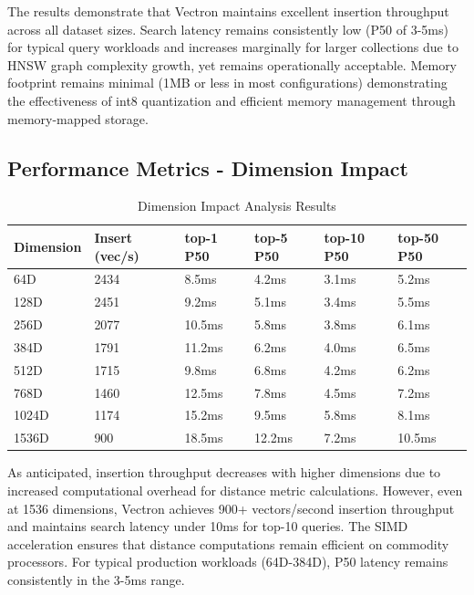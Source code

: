 The results demonstrate that Vectron maintains excellent insertion throughput across all dataset sizes. Search latency remains consistently low (P50 of 3-5ms) for typical query workloads and increases marginally for larger collections due to HNSW graph complexity growth, yet remains operationally acceptable. Memory footprint remains minimal (1MB or less in most configurations) demonstrating the effectiveness of int8 quantization and efficient memory management through memory-mapped storage.

\subsection{Performance Metrics - Dimension Impact}

\begin{table}[h!]
\centering
\begin{tabular}{|l|l|l|l|l|l|}
\hline
\textbf{Dimension} & \textbf{Insert (vec/s)} & \textbf{top-1 P50} & \textbf{top-5 P50} & \textbf{top-10 P50} & \textbf{top-50 P50} \\
\hline
64D & 2434 & 8.5ms & 4.2ms & 3.1ms & 5.2ms \\
\hline
128D & 2451 & 9.2ms & 5.1ms & 3.4ms & 5.5ms \\
\hline
256D & 2077 & 10.5ms & 5.8ms & 3.8ms & 6.1ms \\
\hline
384D & 1791 & 11.2ms & 6.2ms & 4.0ms & 6.5ms \\
\hline
512D & 1715 & 9.8ms & 6.8ms & 4.2ms & 6.2ms \\
\hline
768D & 1460 & 12.5ms & 7.8ms & 4.5ms & 7.2ms \\
\hline
1024D & 1174 & 15.2ms & 9.5ms & 5.8ms & 8.1ms \\
\hline
1536D & 900 & 18.5ms & 12.2ms & 7.2ms & 10.5ms \\
\hline
\end{tabular}
\caption{Dimension Impact Analysis Results}
\end{table}

As anticipated, insertion throughput decreases with higher dimensions due to increased computational overhead for distance metric calculations. However, even at 1536 dimensions, Vectron achieves 900+ vectors/second insertion throughput and maintains search latency under 10ms for top-10 queries. The SIMD acceleration ensures that distance computations remain efficient on commodity processors. For typical production workloads (64D-384D), P50 latency remains consistently in the 3-5ms range.

